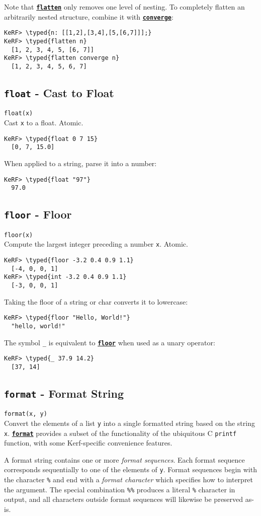 \documentclass{article}
\newcommand{\typed}[1]{\textcolor{TealBlue}{#1}}
\newcommand{\primdefu}[3]{\subsection{\texttt{#1} - #2}\label{prim:#3}}
\newcommand{\primu}[2]{\hyperref[prim:#2]{\textbf{\texttt{#1}}}}
\newcommand{\primdef}[2]{\primdefu{#1}{#2}{#1}}
\newcommand{\prim}[1]{\primu{#1}{#1}}
\newcommand{\comb}[1]{\primu{#1}{#1}}
\begin{document}
Note that \prim{flatten} only removes one level of nesting. To completely flatten an arbitrarily nested structure, combine it with \comb{converge}:
\begin{Verbatim}
KeRF> \typed{n: [[1,2],[3,4],[5,[6,7]]];}
KeRF> \typed{flatten n}
  [1, 2, 3, 4, 5, [6, 7]]
KeRF> \typed{flatten converge n}
  [1, 2, 3, 4, 5, 6, 7]
\end{Verbatim}

\primdef{float}{Cast to Float}
\texttt{float(x)}\\

Cast \texttt{x} to a float. Atomic.
\begin{Verbatim}
KeRF> \typed{float 0 7 15}
  [0, 7, 15.0]
\end{Verbatim}

When applied to a string, parse it into a number:
\begin{Verbatim}
KeRF> \typed{float "97"}
  97.0
\end{Verbatim}

\primdef{floor}{Floor}
\texttt{floor(x)}\\

Compute the largest integer preceding a number \texttt{x}. Atomic.
\begin{Verbatim}
KeRF> \typed{floor -3.2 0.4 0.9 1.1}
  [-4, 0, 0, 1]
KeRF> \typed{int -3.2 0.4 0.9 1.1}
  [-3, 0, 0, 1]
\end{Verbatim}

Taking the floor of a string or char converts it to lowercase:
\begin{Verbatim}
KeRF> \typed{floor "Hello, World!"}
  "hello, world!"
\end{Verbatim}

The symbol \texttt{\_} is equivalent to \prim{floor} when used as a unary operator:
\begin{Verbatim}
KeRF> \typed{_ 37.9 14.2}
  [37, 14]
\end{Verbatim}

\primdef{format}{Format String}
\texttt{format(x, y)}\\

Convert the elements of a list \texttt{y} into a single formatted string based on the string \texttt{x}. \prim{format} provides a subset of the functionality of the ubiquitous C \texttt{printf} function, with some Kerf-specific convenience features.

\vspace{0.5cm}

A format string contains one or more \emph{format sequences}. Each format sequence corresponds sequentially to one of the elements of \texttt{y}. Format sequences begin with the character \texttt{\%} and end with a \emph{format character} which specifies how to interpret the argument. The special combination \texttt{\%\%} produces a literal \texttt{\%} character in output, and all characters outside format sequences will likewise be preserved as-is.
\end{document}
